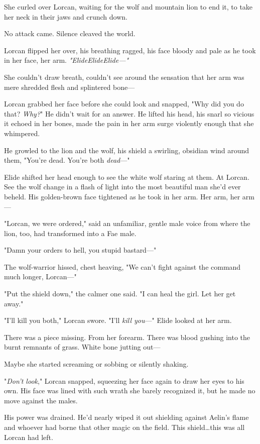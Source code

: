 She curled over Lorcan, waiting for the wolf and mountain lion to end it, to take her neck in their jaws and crunch down.

No attack came.
Silence cleaved the world.

Lorcan flipped her over, his breathing ragged, his face bloody and pale as he took in her face, her arm.
\emph{"ElideElideElide---"}

She couldn't draw breath, couldn't see around the sensation that her arm was mere shredded flesh and splintered bone---

Lorcan grabbed her face before she could look and snapped, "Why did you do that?
\emph{Why?}" He didn't wait for an answer.
He lifted his head, his snarl so vicious it echoed in her bones, made the pain in her arm surge violently enough that she whimpered.

He growled to the lion and the wolf, his shield a swirling, obsidian wind around them, "You're dead.
You're both \emph{dead}---"

Elide shifted her head enough to see the white wolf staring at them.
At Lorcan.
See the wolf change in a flash of light into the most beautiful man she'd ever beheld.
His golden-brown face tightened as he took in her arm.
Her arm, her arm---

"Lorcan, we were ordered," said an unfamiliar, gentle male voice from where the lion, too, had transformed into a Fae male.

"Damn your orders to hell, you stupid bastard---"

The wolf-warrior hissed, chest heaving, "We can't fight against the command much longer, Lorcan---"

"Put the shield down," the calmer one said.
"I can heal the girl.
Let her get away."

"I'll kill you both," Lorcan swore.
"I'll \emph{kill you}---" Elide looked at her arm.

There was a piece missing.
From her forearm.
There was blood gushing into the burnt remnants of grass.
White bone jutting out---

Maybe she started screaming or sobbing or silently shaking.

"\emph{Don't look}," Lorcan snapped, squeezing her face again to draw her eyes to his own.
His face was lined with such wrath she barely recognized it, but he made no move against the males.

His power was drained.
He'd nearly wiped it out shielding against Aelin's flame and whoever had borne that other magic on the field.
This shield\ldots this was all Lorcan had left.

